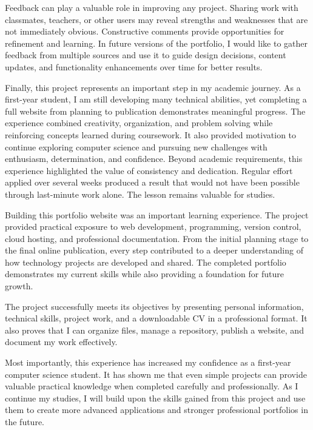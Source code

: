\documentclass[12pt]{article}
\begin{document}
Feedback can play a valuable role in improving any project. Sharing work with classmates, teachers, or other users may reveal strengths and weaknesses that are not immediately obvious. Constructive comments provide opportunities for refinement and learning. In future versions of the portfolio, I would like to gather feedback from multiple sources and use it to guide design decisions, content updates, and functionality enhancements over time for better results.

Finally, this project represents an important step in my academic journey. As a first-year student, I am still developing many technical abilities, yet completing a full website from planning to publication demonstrates meaningful progress. The experience combined creativity, organization, and problem solving while reinforcing concepts learned during coursework. It also provided motivation to continue exploring computer science and pursuing new challenges with enthusiasm, determination, and confidence. Beyond academic requirements, this experience highlighted the value of consistency and dedication. Regular effort applied over several weeks produced a result that would not have been possible through last-minute work alone. The lesson remains valuable for studies.

Building this portfolio website was an important learning experience. The project provided practical exposure to web development, programming, version control, cloud hosting, and professional documentation. From the initial planning stage to the final online publication, every step contributed to a deeper understanding of how technology projects are developed and shared. The completed portfolio demonstrates my current skills while also providing a foundation for future growth.

The project successfully meets its objectives by presenting personal information, technical skills, project work, and a downloadable CV in a professional format. It also proves that I can organize files, manage a repository, publish a website, and document my work effectively.

Most importantly, this experience has increased my confidence as a first-year computer science student. It has shown me that even simple projects can provide valuable practical knowledge when completed carefully and professionally. As I continue my studies, I will build upon the skills gained from this project and use them to create more advanced applications and stronger professional portfolios in the future.
\end{document}
